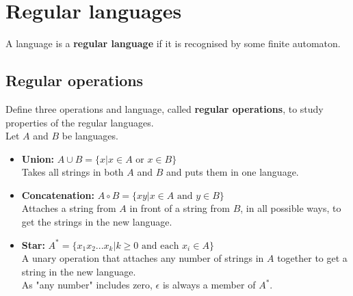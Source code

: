 \documentclass{article}
\begin{document}
\section{Regular languages}
A language is a \textbf{regular language} if it is recognised by some finite automaton.

\subsection{Regular operations}
Define three operations and language, called \textbf{regular operations}, to study properties of the regular languages.\medskip
\\ Let $A$ and $B$ be languages.
\begin{itemize}
	\item \textbf{Union:} $A \cup B = \{x | x \in A\text{ or } x \in B\}$
	\\ Takes all strings in both $A$ and $B$ and puts them in one language.
	\item \textbf{Concatenation:} $A \circ B = \{xy | x \in A\text{ and } y \in B\}$
	\\ Attaches a string from $A$ in front of a string from $B$, in all possible ways, to get the strings in the new language.
	\item \textbf{Star:} $A^* = \{x_1x_2...x_k | k \geq 0\text{ and each } x_i \in A\}$
	\\ A unary operation that attaches any number of strings in $A$ together to get a string in the new language.
	\\ As "any number" includes zero, $\epsilon$ is always a member of $A^*$.
\end{itemize}
\end{document}
